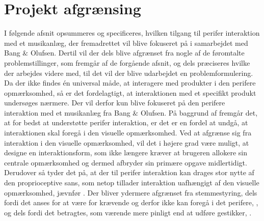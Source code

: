 \chapter{Projekt afgrænsing}
\label{Afgraensning}
%
I følgende afsnit opsummeres og specificeres, hvilken tilgang til perifer interaktion med et musikanlæg, der fremadrettet vil blive fokuseret på i samarbejdet med Bang $\&$ Olufsen. Dertil vil der dels blive afgrænset fra nogle af de føromtalte problemstillinger, som fremgår af de forgående afsnit, og dels præciseres hvilke der arbejdes videre med, til det vil der blive udarbejdet en problemformulering.\blankline
% 
Da der ikke findes én universal måde, at interagere med produkter i den perifere opmærksomhed, så er det fordelagtigt, at interaktionen med et specifikt produkt undersøges nærmere. Der vil derfor kun blive fokuseret på den perifere interaktion med et musikanlæg fra Bang $\&$ Olufsen. På baggrund af  fremgår det, at for bedst at understøtte perifer interaktion, er det er en fordel at undgå, at interaktionen skal foregå i den visuelle opmærksomhed. Ved at afgrænse sig fra interaktion i den visuelle opmærksomhed, vil det i højere grad være muligt, at designe en interaktionsform, som ikke længere kræver at brugeren allokere sin centrale opmærksomhed og dermed afbryder sin primære opgave midlertidigt. Derudover så tyder det på, at der til perifer interaktion kan drages stor nytte af den proprioceptive sans, som netop tillader interaktion uafhængigt af den visuelle opmærksomhed, jævnfør . Der bliver ydermere afgrænset fra stemmestyring, dels fordi det anses for at være for krævende og derfor ikke kan foregå i det perifere, \parencite[s. 41]{PDF:PIEmbeddingHCIMicroManageMe}, og dels fordi det betragtes, som værende mere pinligt end at udføre gestikker, \parencite[s. 4]{PDF:AnExploratoryStudy}.        

